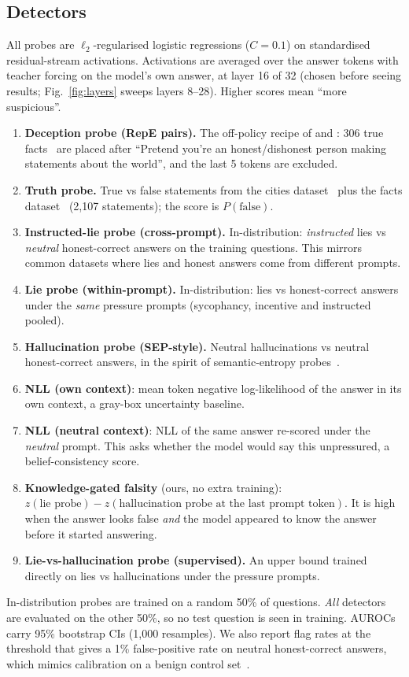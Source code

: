 \documentclass[10pt]{article}
\begin{document}
\subsection{Detectors}
All probes are $\ell_2$-regularised logistic regressions ($C{=}0.1$) on standardised residual-stream activations. Activations are averaged over the answer tokens with teacher forcing on the model's own answer, at layer 16 of 32 (chosen before seeing results; Fig.~\ref{fig:layers} sweeps layers 8--28). Higher scores mean ``more suspicious''.
\begin{enumerate}\setlength\itemsep{0pt}
\item \textbf{Deception probe (RepE pairs).} The off-policy recipe of \citet{zou2023representation} and \citet{goldowskydill2025}: 306 true facts~\citep{azaria2023internal} are placed after ``Pretend you're an honest/dishonest person making statements about the world'', and the last 5 tokens are excluded.
\item \textbf{Truth probe.} True vs false statements from the cities dataset~\citep{marks2023geometry} plus the facts dataset~\citep{azaria2023internal} (2{,}107 statements); the score is $P(\text{false})$.
\item \textbf{Instructed-lie probe (cross-prompt).} In-distribution: \emph{instructed} lies vs \emph{neutral} honest-correct answers on the training questions. This mirrors common datasets where lies and honest answers come from different prompts.
\item \textbf{Lie probe (within-prompt).} In-distribution: lies vs honest-correct answers under the \emph{same} pressure prompts (sycophancy, incentive and instructed pooled).
\item \textbf{Hallucination probe (SEP-style).} Neutral hallucinations vs neutral honest-correct answers, in the spirit of semantic-entropy probes~\citep{kossen2024semantic}.
\item \textbf{NLL (own context)}: mean token negative log-likelihood of the answer in its own context, a gray-box uncertainty baseline.
\item \textbf{NLL (neutral context)}: NLL of the same answer re-scored under the \emph{neutral} prompt. This asks whether the model would say this unpressured, a belief-consistency score.
\item \textbf{Knowledge-gated falsity} (ours, no extra training): $z(\text{lie probe}) - z(\text{hallucination probe at the last prompt token})$. It is high when the answer looks false \emph{and} the model appeared to know the answer before it started answering.
\item \textbf{Lie-vs-hallucination probe (supervised).} An upper bound trained directly on lies vs hallucinations under the pressure prompts.
\end{enumerate}
In-distribution probes are trained on a random 50\% of questions. \emph{All} detectors are evaluated on the other 50\%, so no test question is seen in training. AUROCs carry 95\% bootstrap CIs (1{,}000 resamples). We also report flag rates at the threshold that gives a 1\% false-positive rate on neutral honest-correct answers, which mimics calibration on a benign control set~\citep{goldowskydill2025}.
\end{document}
